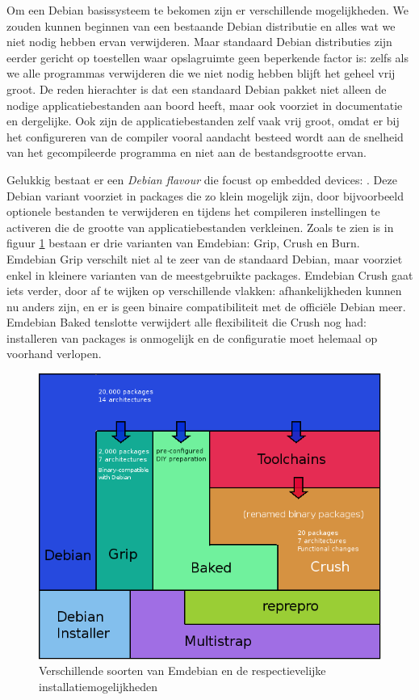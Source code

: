 Om een Debian basissysteem te bekomen zijn er verschillende mogelijkheden. We zouden kunnen beginnen van een bestaande Debian distributie en alles wat we niet nodig hebben ervan verwijderen. Maar standaard Debian distributies zijn eerder gericht op toestellen waar opslagruimte geen beperkende factor is: zelfs als we alle programmas verwijderen die we niet nodig hebben blijft het geheel vrij groot. De reden hierachter is dat een standaard Debian pakket niet alleen de nodige applicatiebestanden aan boord heeft, maar ook voorziet in documentatie en dergelijke. Ook zijn de applicatiebestanden zelf vaak vrij groot, omdat er bij het configureren van de compiler vooral aandacht besteed wordt aan de snelheid van het gecompileerde programma en niet aan de bestandsgrootte ervan.

Gelukkig bestaat er een \emph{Debian flavour} die focust op embedded devices: . Deze Debian variant voorziet in packages die zo klein mogelijk zijn, door bijvoorbeeld optionele bestanden te verwijderen en tijdens het compileren instellingen te activeren die de grootte van applicatiebestanden verkleinen. Zoals te zien is in figuur \ref{fig:emdebian:flavours} bestaan er drie varianten van Emdebian: Grip, Crush en Burn. Emdebian Grip verschilt niet al te zeer van de standaard Debian, maar voorziet enkel in kleinere varianten van de meestgebruikte packages. Emdebian Crush gaat iets verder, door af te wijken op verschillende vlakken: afhankelijkheden kunnen nu anders zijn, en er is geen binaire compatibiliteit met de officiële Debian meer. Emdebian Baked tenslotte verwijdert alle flexibiliteit die Crush nog had: installeren van packages is onmogelijk en de configuratie moet helemaal op voorhand verlopen.

\begin{figure}
	\includegraphics[width=\textwidth]{afbeeldingen/emdebian_soorten}
	\caption{Verschillende soorten van Emdebian en de respectievelijke installatiemogelijkheden}
	\label{fig:emdebian:flavours}
\end{figure}

